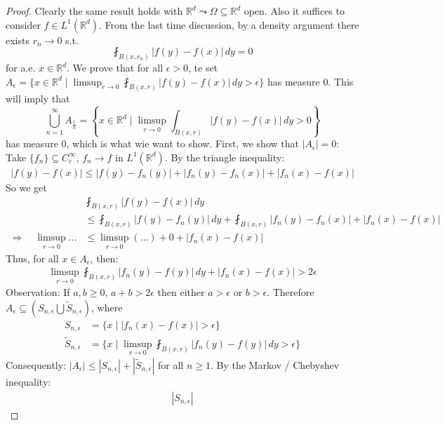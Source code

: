 \documentclass{report}
\theoremstyle{tommy}
\begin{document}
  \begin{proof}
    Clearly the same result holds with \(\mathbb{R}^d \leadsto \Omega \subseteq \mathbb{R}^d\) open. Also it suffices to consider \(f \in L^1(\mathbb{R}^d)\). From the last time discussion, by a density argument there exists \(r_n \to 0\) s.t.
    \[\fint_{B(x, r_n)} |f(y) - f(x)| \, dy = 0\]
    for a.e. \(x \in \mathbb{R}^d\). We prove that for all \(\epsilon > 0\), te set \(A_\epsilon = \{x \in \mathbb{R}^d \mid \limsup_{r \to 0} \fint_{B(x,r)} |f(y) - f(x)| \, dy > \epsilon\}\) has measure \(0\). This will imply that 
    \[\bigcup_{n = 1}^\infty A_{\frac{1}{n}} = \left\{x \in \mathbb{R}^d \mid \limsup_{r \to 0} \int_{B(x,r)} |f(y) - f(x)| \, dy > 0\right\}\] has measure \(0\), which is what wie want to show. First, we show that \(|A_\epsilon| = 0\): Take \(\{f_n\} \subseteq C_c^\infty\), \(f_n \to f\) in \(L^1(\mathbb{R}^d)\). By the triangle inequality:
    \begin{align*}
      |f(y) - f(x)| \le |f(y) - f_n(y)| + |f_n(y) - f_n(x)| + |f_n(x) - f(x)|
    \end{align*}
    So we get 
    \begin{align*}
      &\fint_{B(x,r)} |f(y) - f(x)| \, dy \\
      \quad &\le \fint_{B(x,r)}|f(y) - f_n(y)| \, dy + \fint_{B(x, r)} |f_n(y) - f_n(x)| + |f_n(x) - f(x)| \\
      \Rightarrow \quad \limsup_{r \to 0} ... &\le \limsup_{r \to 0} (\dots) +0 + |f_n(x) - f(x)|
    \end{align*}
    Thus, for all \(x \in A_\epsilon\), then:
    \begin{align*}
      \limsup_{r \to 0} \fint_{B(x, r)} |f_n(y) - f(y)| \, dy + |f_n(x) - f(x)| > 2 \epsilon
    \end{align*}
    Observation: If \(a, b \ge 0\), \(a + b > 2 \epsilon\) then either \(a > \epsilon\) or \(b > \epsilon\). Therefore \(A_\epsilon \subseteq \left(S_{n, \epsilon} \bigcup \tilde S_{n, \epsilon}\right)\), where
    \begin{align*}
      S_{n, \epsilon} &= \{x \mid |f_n(x) - f(x)| > \epsilon\} \\
      \tilde S_{n, \epsilon} &= \{x \mid \limsup_{r \to 0} \fint_{B(x,r)} |f_n(y) - f(y)| \, dy > \epsilon\}
    \end{align*}
    Consequently: \(|A_\epsilon| \le |S_{n, \epsilon}| + |\tilde S_{n, \epsilon}|\) for all \(n \ge 1\). By the Markov / Chebyshev inequality:
    \begin{align*}
      |S_{n, \epsilon}| 

\end{align*}
\end{proof}
\end{document}
